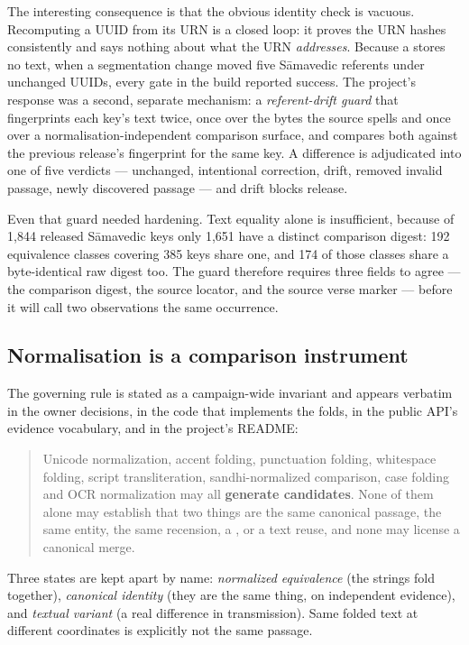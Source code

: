 The interesting consequence is that the obvious identity check is vacuous. Recomputing
a \mbox{UUID} from its \mbox{URN} is a closed loop: it proves the \mbox{URN} hashes
consistently and says nothing about what the \mbox{URN} \emph{addresses}. Because a
 stores no text, when a segmentation change moved five S\=amavedic
referents under unchanged \mbox{UUID}s, every gate in the build reported success. The
project's response was a second, separate mechanism: a \emph{referent-drift guard}
that fingerprints each key's text twice, once over the bytes the source spells and
once over a normalisation-independent comparison surface, and compares both against
the previous release's fingerprint for the same key. A difference is adjudicated into
one of five verdicts --- unchanged, intentional correction, drift, removed invalid
passage, newly discovered passage --- and drift blocks release.

Even that guard needed hardening. Text equality alone is insufficient, because of
1{,}844 released S\=amavedic keys only 1{,}651 have a distinct comparison digest:
192 equivalence classes covering 385 keys share one, and 174 of those classes share a
byte-identical raw digest too. The guard therefore requires three fields to agree ---
the comparison digest, the source locator, and the source verse marker --- before it
will call two observations the same occurrence.

\subsection{Normalisation is a comparison instrument}
\label{sec:normalisation}

The governing rule is stated as a campaign-wide invariant and appears verbatim in the
owner decisions, in the code that implements the folds, in the public API's evidence
vocabulary, and in the project's README:

\begin{quote}\small
Unicode normalization, accent folding, punctuation folding, whitespace folding, script
transliteration, sandhi-normalized comparison, case folding and OCR normalization may
all \textbf{generate candidates}. None of them alone may establish that two things are
the same canonical passage, the same entity, the same recension, a
, or a text reuse, and none may license a canonical merge.
\end{quote}

Three states are kept apart by name: \emph{normalized equivalence} (the strings fold
together), \emph{canonical identity} (they are the same thing, on independent
evidence), and \emph{textual variant} (a real difference in transmission). Same folded
text at different coordinates is explicitly not the same passage.

